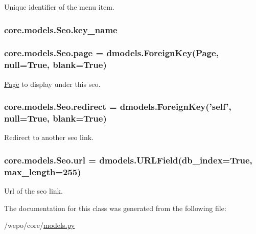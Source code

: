 Unique identifier of the menu item. 

\hypertarget{classcore_1_1models_1_1Seo_a644a0f17aaa68dc004c064e4f8be688d}{
\subsubsection[{key\-\_\-name}]{\setlength{\rightskip}{0pt plus 5cm}core.\-models.\-Seo.\-key\-\_\-name}}\label{classcore_1_1models_1_1Seo_a644a0f17aaa68dc004c064e4f8be688d}
\hypertarget{classcore_1_1models_1_1Seo_ae72954b787413173ed2e710d3add951a}{
\subsubsection[{page}]{\setlength{\rightskip}{0pt plus 5cm}core.\-models.\-Seo.\-page = dmodels.\-Foreign\-Key({\bf Page}, null=True, blank=True)\hspace{0.3cm}{\ttfamily [static]}}}\label{classcore_1_1models_1_1Seo_ae72954b787413173ed2e710d3add951a}


\hyperlink{classcore_1_1models_1_1Page}{Page} to display under this seo. 

\hypertarget{classcore_1_1models_1_1Seo_a67e819a81be21ee3247e3f0d733d6772}{
\subsubsection[{redirect}]{\setlength{\rightskip}{0pt plus 5cm}core.\-models.\-Seo.\-redirect = dmodels.\-Foreign\-Key('self', null=True, blank=True)\hspace{0.3cm}{\ttfamily [static]}}}\label{classcore_1_1models_1_1Seo_a67e819a81be21ee3247e3f0d733d6772}


Redirect to another seo link. 

\hypertarget{classcore_1_1models_1_1Seo_a7d34532dc903e2764ef053b995d9a0f9}{
\subsubsection[{url}]{\setlength{\rightskip}{0pt plus 5cm}core.\-models.\-Seo.\-url = dmodels.\-U\-R\-L\-Field(db\-\_\-index=True, max\-\_\-length=255)\hspace{0.3cm}{\ttfamily [static]}}}\label{classcore_1_1models_1_1Seo_a7d34532dc903e2764ef053b995d9a0f9}


Url of the seo link. 



The documentation for this class was generated from the following file\-:\begin{DoxyCompactItemize}
\item 
/wepo/core/\hyperlink{models_8py}{models.\-py}\end{DoxyCompactItemize}
